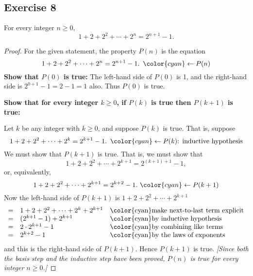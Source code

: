 \documentclass[14pt]{extarticle}
\newcommand{\from}{\leftarrow}
\newcommand{\cy}{\color{cyan}}
\begin{document}
\subsection{Exercise 8}
For every integer $n \geq 0$,
\[
    1 + 2 + 2^2 + \cdots + 2^n = 2^{n+1} - 1.
\]
\begin{proof}
    For the given statement, the property $P(n)$ is the equation
    \[
        1 + 2 + 2^2 + \cdots + 2^n = 2^{n+1} - 1. \,\,\, {\cy \from P(n)}
    \]
    {\bf Show that $P(0)$ is true:} The left-hand side of $P(0)$ is 1, and the right-hand side is $2^{0+1} - 1 = 2 - 1 = 1$ also. Thus $P(0)$ is true.

        {\bf Show that for every integer $k \geq 0$, if $P(k)$ is true then $P(k + 1)$ is true:}

    Let $k$ be any integer with $k \geq 0$, and suppose $P(k)$ is true. That is, suppose
    \[
        1 + 2 + 2^2 + \cdots + 2^k = 2^{k+1} - 1. \,\,\, {\cy \from P(k) \text{: inductive hypothesis}}
    \]
    We must show that $P(k + 1)$ is true. That is, we must show that
    \[
        1 + 2 + 2^2 + \cdots + 2^{k+1} = 2^{(k+1)+1} - 1,
    \]
    or, equivalently,
    \[
        1 + 2 + 2^2 + \cdots + 2^{k+1} = 2^{k+2} - 1. \,\, {\cy \from P(k + 1)}
    \]
    Now the left-hand side of $P(k + 1)$ is $1 + 2 + 2^2 + \cdots + 2^{k+1}$
    \[
        \begin{array}{lll}
            = & 1 + 2 + 2^2 + \cdots + 2^k + 2^{k+1} & \text{\cy make next-to-last term explicit} \\
            = & (2^{k+1} - 1) + 2^{k+1}              & \text{\cy by inductive hypothesis}         \\
            = & 2 \cdot 2^{k+1} - 1                  & \text{\cy by combining like terms}         \\
            = & 2^{k+2} - 1                          & \text{\cy by the laws of exponents}
        \end{array}
    \]
    and this is the right-hand side of $P(k + 1)$. Hence $P(k + 1)$ is true. {\it [Since both the basis step and the inductive step have been proved, $P(n)$ is true for every integer $n \geq 0$.]}
\end{proof}
\end{document}
